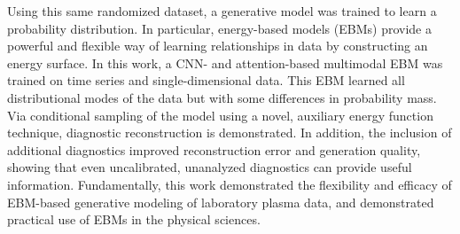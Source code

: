{Using this same randomized dataset, a generative model was trained to learn a probability distribution. In particular, energy-based models (EBMs) provide a powerful and flexible way of learning relationships in data by constructing an energy surface. In this work, a CNN- and attention-based multimodal EBM was trained on time series and single-dimensional data. This EBM learned all distributional modes of the data but with some differences in probability mass. Via conditional sampling of the model using a novel, auxiliary energy function technique, diagnostic reconstruction is demonstrated. In addition, the inclusion of additional diagnostics improved reconstruction error and generation quality, showing that even uncalibrated, unanalyzed diagnostics can provide useful information. Fundamentally, this work demonstrated the flexibility and efficacy of EBM-based generative modeling of laboratory plasma data, and demonstrated practical use of EBMs in the physical sciences.
}

